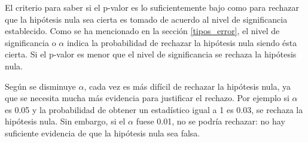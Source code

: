 El criterio para saber si el p-valor es lo suficientemente bajo como para rechazar que la hipótesis nula sea cierta
es tomado de acuerdo al nivel de significancia establecido. Como se ha mencionado en la sección \ref{tipos_error}, el
nivel de significancia o $\alpha$ indica la probabilidad de rechazar la hipótesis nula siendo ésta cierta. Si el
p-valor es menor que el nivel de significancia se rechaza la hipótesis nula.

Según se disminuye $\alpha$, cada vez es más difícil de rechazar la hipótesis nula, ya que se necesita mucha más
evidencia para justificar el rechazo. Por ejemplo si $\alpha$ es 0.05 y la probabilidad de obtener un estadístico
igual a 1 es 0.03, se rechaza la hipótesis nula. Sin embargo, si el $\alpha$ fuese 0.01, no se podría rechazar: no hay suficiente evidencia de que la hipótesis nula sea falsa.


